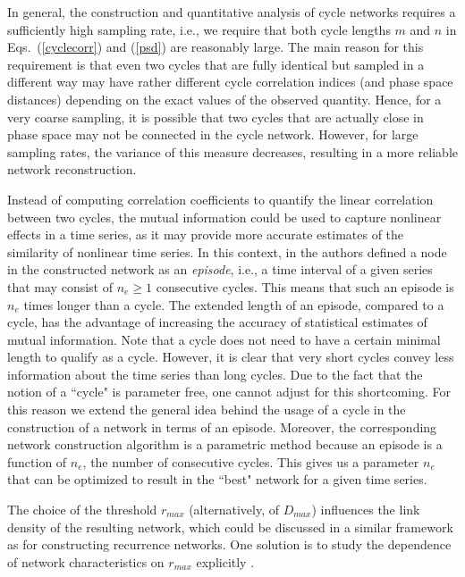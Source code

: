 		In general, the construction and quantitative analysis of cycle networks requires a sufficiently high sampling rate, i.e., we require that both cycle lengths $m$ and $n$ in Eqs.~(\ref{cyclecorr}) and (\ref{psd}) are reasonably large. The main reason for this requirement is that even two cycles that are fully identical but sampled in a different way may have rather different cycle correlation indices (and phase space distances) depending on the exact values of the observed quantity. Hence, for a very coarse sampling, it is possible that two cycles that are actually close in phase space may not be connected in the cycle network. However, for large sampling rates, the variance of this measure decreases, resulting in a more reliable network reconstruction.

		Instead of computing correlation coefficients to quantify the linear correlation between two cycles, the mutual information could be used to capture nonlinear effects in a time series, as it may provide more accurate estimates of the similarity of nonlinear time series. In this context, in \cite{Emmert2011} the authors defined a node in the constructed network as an \emph{episode}, i.e., a time interval of a given series that may consist of $n_e \ge 1$ consecutive cycles. This means that such an episode is $n_e$ times longer than a cycle. The extended length of an episode, compared to a cycle, has the advantage of increasing the accuracy of statistical estimates of  mutual information. Note that a cycle does not need to have a certain minimal length to qualify as a cycle. However, it is clear that very short cycles convey less information about the time series than long cycles. Due to the fact that the notion of a ``cycle" is parameter free, one cannot adjust for this shortcoming. For this reason we extend the general idea behind the usage of a cycle in the construction of a network \cite{Zhang2006} in terms of an episode. Moreover, the corresponding network construction algorithm is a parametric method because an episode is a function of $n_e$, the number of consecutive cycles. This gives us a parameter $n_e$ that can be optimized to result in the ``best" network for a given time series.

		The choice of the threshold $r_{max}$ (alternatively, of $D_{max}$) influences the link density of the resulting network, which could be discussed in a similar framework as for constructing recurrence networks. One solution is to study the dependence of network characteristics on $r_{max}$ explicitly \cite{Zhang2006}.

